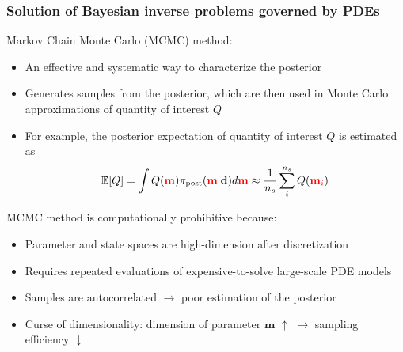 \documentclass{beamer}
\begin{document}
\begin{frame}
  \frametitle{Solution of Bayesian inverse problems governed by PDEs}

  \begin{block}{Markov Chain Monte Carlo (MCMC) method:}
    \begin{itemize}
      \item An effective and systematic way to characterize the posterior
      \item Generates samples from the posterior, which are then used in Monte
        Carlo approximations of quantity of interest $Q$
      \item For example, the posterior expectation of quantity of interest $Q$ is estimated as
        \vspace{-0.5cm}
        $$
          \mathbb{E}[Q] = \int Q(\mathbf{\textcolor{red}{m}}) \pi_\text{post} (\mathbf{\textcolor{red}{m}} |
          \mathbf{d}) d \mathbf{\textcolor{red}{m}}
          \approx \frac{1}{n_s} \sum_{i}^{n_s} Q(\textcolor{red}{\mathbf{m}_i})
        $$
    \end{itemize}
  \end{block}

  \begin{block}{MCMC method is computationally prohibitive because:}
    \begin{itemize}
      \item Parameter and state spaces are high-dimension after discretization
      \item Requires repeated evaluations of expensive-to-solve large-scale PDE models
      \item Samples are autocorrelated $\rightarrow$ poor estimation of the
        posterior
      \item Curse of dimensionality: dimension of parameter $\mathbf{m}$ $\uparrow$
        $\rightarrow$ sampling efficiency $\downarrow$
    \end{itemize}
  \end{block}
\end{frame}
\end{document}
